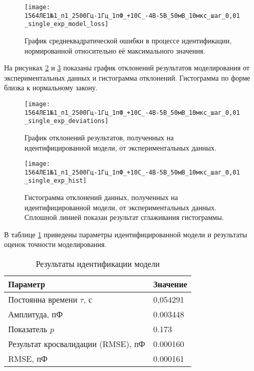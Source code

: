 	\begin{figure}[!htp]
		\centering
		\texttt{[image: 1564ЛЕ1№1\_п1\_2500Гц-1Гц\_1пФ\_+10С\_-4В-5В\_50мВ\_10мкс\_шаг\_0,01\_single\_exp\_model\_loss]}
		\caption{График среднеквадратической ошибки в процессе идентификации,
		         нормированной относительно её максимального значения.}
		\label{pic:loss_single_exp_283}
	\end{figure}

	На рисунках \ref{pic:deviations_single_exp_283} и \ref{pic:hist_single_exp_283}
	показаны график отклонений результатов моделирования от экспериментальных
	данных и гистограмма отклонений. Гистограмма по форме близка к нормальному
	закону.

	\begin{figure}[!htp]
		\centering
		\texttt{[image: 1564ЛЕ1№1\_п1\_2500Гц-1Гц\_1пФ\_+10С\_-4В-5В\_50мВ\_10мкс\_шаг\_0,01\_single\_exp\_deviations]}
		\caption{График отклонений результатов, полученных на идентифицированной
		модели, от экспериментальных данных.}
		\label{pic:deviations_single_exp_283}
	\end{figure}

	\begin{figure}[!htp]
		\centering
		\texttt{[image: 1564ЛЕ1№1\_п1\_2500Гц-1Гц\_1пФ\_+10С\_-4В-5В\_50мВ\_10мкс\_шаг\_0,01\_single\_exp\_hist]}
		\caption{Гистограмма отклонений данных, полученных на идентифицированной 
		         модели, от экспериментальных данных. Сплошной линией показан
		         результат сглаживания гистограммы.}
		\label{pic:hist_single_exp_283}
	\end{figure}

	В таблице \ref{table:results_single_exp_283} приведены параметры 
	идентифицированной модели и результаты оценок точности моделирования.

	\begin{table}[!htp]
		\centering
		\caption{Результаты идентификации модели}
		\begin{tabular}{|l|l|}
			\hline
			Параметр                           & Значение \\ \hline
			Постоянна времени $\tau$, с        & 0,054291 \\ \hline
			Амплитуда, пФ                      & 0.003448 \\ \hline
			Показатель $p$                     & 0.173    \\ \hline
			Результат кросвалидации (RMSE), пФ & 0.000160 \\ \hline
			RMSE, пФ                           & 0.000161 \\ \hline
		\end{tabular}
		\label{table:results_single_exp_283}
	\end{table}

